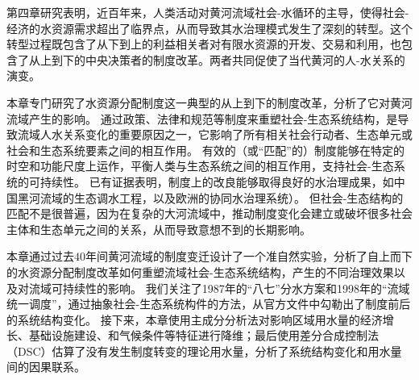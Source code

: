 第四章研究表明，近百年来，人类活动对黄河流域社会-水循环的主导，使得社会-经济的水资源需求超出了临界点，从而导致其水治理模式发生了深刻的转型。这个转型过程既包含了从下到上的利益相关者对有限水资源的开发、交易和利用，也包含了从上到下的中央决策者的制度改革。两者共同促使了当代黄河的人-水关系的演变。

本章专门研究了水资源分配制度这一典型的从上到下的制度改革，分析了它对黄河流域产生的影响。
通过政策、法律和规范等制度来重塑社会-生态系统结构，是导致流域人水关系变化的重要原因之一，它影响了所有相关社会行动者、生态单元或社会和生态系统要素之间的相互作用\cite{lien2020, bodin2017b}。
有效的（或“匹配”的）制度能够在特定的时空和功能尺度上运作，平衡人类与生态系统之间的相互作用，支持社会-生态系统的可持续性\cite{epstein2015, wang2019d}。
已有证据表明，制度上的改良能够取得良好的水治理成果，如中国黑河流域的生态调水工程\cite{wang2019d}，以及欧洲的协同水治理系统\cite{green2013}）。
但社会-生态结构的匹配不是很普遍，因为在复杂的大河流域中，推动制度变化会建立或破坏很多社会主体和生态单元之间的关系，从而导致意想不到的长期影响。

本章通过过去$40$年间黄河流域的制度变迁设计了一个准自然实验，分析了自上而下的水资源分配制度改革如何重塑流域社会-生态系统结构，产生的不同治理效果以及对流域可持续性的影响。
我们关注了1987年的“八七”分水方案和1998年的“流域统一调度”，通过抽象社会-生态系统构件的方法，从官方文件中勾勒出了制度前后的系统结构变化。
接下来，本章使用主成分分析法对影响区域用水量的经济增长、基础设施建设、和气候条件等特征进行降维；最后使用差分合成控制法（DSC）\cite{arkhangelsky2021}估算了没有发生制度转变的理论用水量，分析了系统结构变化和用水量间的因果联系。
